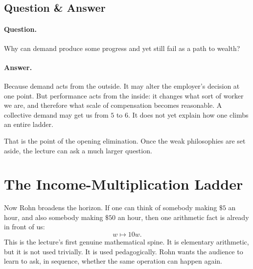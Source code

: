 \subsection{Question \& Answer}

\paragraph{Question.} Why can demand produce some progress and yet still fail as a path to wealth?

\paragraph{Answer.} Because demand acts from the outside. It may alter the employer's decision at one point. But performance acts from the inside: it changes what sort of worker we are, and therefore what scale of compensation becomes reasonable. A collective demand may get us from \(5\) to \(6\). It does not yet explain how one climbs an entire ladder.

That is the point of the opening elimination. Once the weak philosophies are set aside, the lecture can ask a much larger question.

\section{The Income-Multiplication Ladder}

Now Rohn broadens the horizon. If one can think of somebody making \(\$5\) an hour, and also somebody making \(\$50\) an hour, then one arithmetic fact is already in front of us:
\begin{equation}
w \mapsto 10w.
\end{equation}
This is the lecture's first genuine mathematical spine. It is elementary arithmetic, but it is not used trivially. It is used pedagogically. Rohn wants the audience to learn to ask, in sequence, whether the same operation can happen again.

